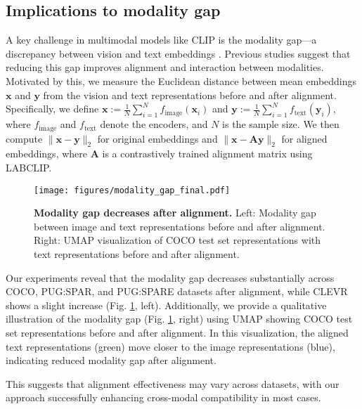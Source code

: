  \subsection{Implications to modality gap}


A key challenge in multimodal models like CLIP is the modality gap—a discrepancy between vision and text embeddings \cite{liang2022mind}. Previous studies \cite{schrodi2024two} suggest that reducing this gap improves alignment and interaction between modalities. Motivated by this, we measure the Euclidean distance between mean embeddings $\mathbf{x}$ and $\mathbf{y}$ from the vision and text representations before and after alignment. Specifically, we define $\mathbf{x} := \frac{1}{N} \sum_{i=1}^N f_{\text{image}}(\mathbf{x}_i)$ and $\mathbf{y} := \frac{1}{N} \sum_{i=1}^N f_{\text{text}}(\mathbf{y}_i)$, where $f_{\text{image}}$ and $f_{\text{text}}$ denote the encoders, and $N$ is the sample size. We then compute $\|\mathbf{x} - \mathbf{y}\|_2$ for original embeddings and $\|\mathbf{x} - \mathbf{A}\mathbf{y}\|_2$ for aligned embeddings, where $\mathbf{A}$ is a contrastively trained alignment matrix using LABCLIP.

\begin{figure}[ht]
  \centering
      \texttt{[image: figures/modality\_gap\_final.pdf]}
  \vspace{-0.8em}
  \caption{\textbf{Modality gap decreases after alignment.} Left: Modality gap between image and text representations before and after alignment. Right: UMAP visualization of COCO test set representations with text representations before and after alignment.}
  \label{fig:modality_gap}
\end{figure}

Our experiments reveal that the modality gap decreases substantially across COCO, PUG:SPAR, and PUG:SPARE datasets after alignment, while CLEVR shows a slight increase (Fig. \ref{fig:modality_gap}, left). Additionally, we provide a qualitative illustration of the modality gap (Fig. \ref{fig:modality_gap}, right) using UMAP \cite{mcinnes2018umap} showing COCO test set representations before and after alignment. In this visualization, the aligned text representations (green) move closer to the image representations (blue), indicating reduced modality gap after alignment. 

This suggests that alignment effectiveness may vary across datasets, with our approach successfully enhancing cross-modal compatibility in most cases.











